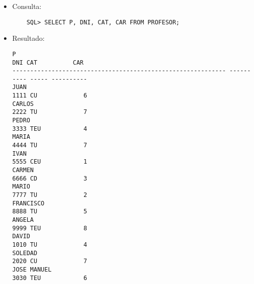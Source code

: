 \documentclass[11pt]{report}
\begin{document}
\begin{itemize}
  \item Consulta:
  \begin{verbatim}
    SQL> SELECT P, DNI, CAT, CAR FROM PROFESOR;
  \end{verbatim}
  \item{Resultado:}
  \begin{verbatim}
P                                                                   DNI CAT          CAR                                                                                                                
------------------------------------------------------------ ---------- ----- ----------                                                                                                                
JUAN                                                               1111 CU             6                                                                                                                
CARLOS                                                             2222 TU             7                                                                                                                
PEDRO                                                              3333 TEU            4                                                                                                                
MARIA                                                              4444 TU             7                                                                                                                
IVAN                                                               5555 CEU            1                                                                                                                
CARMEN                                                             6666 CD             3                                                                                                                
MARIO                                                              7777 TU             2                                                                                                                
FRANCISCO                                                          8888 TU             5                                                                                                                
ANGELA                                                             9999 TEU            8                                                                                                                
DAVID                                                              1010 TU             4                                                                                                                
SOLEDAD                                                            2020 CU             7                                                                                                                
JOSE MANUEL                                                        3030 TEU            6                                                                                                                


\end{verbatim}
\end{itemize}
\end{document}
